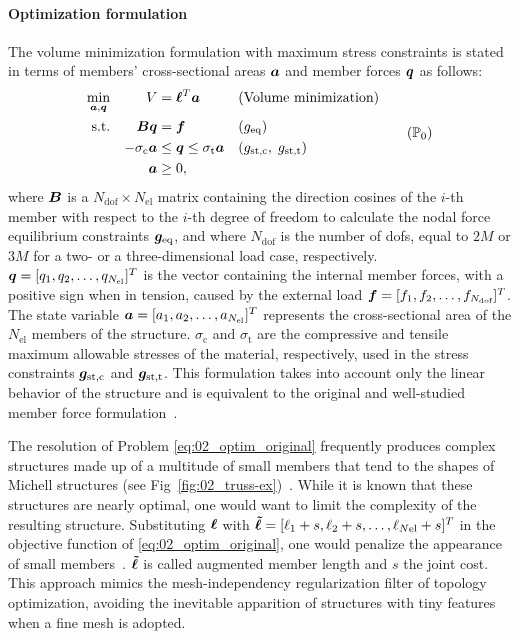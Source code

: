 \paragraph{Optimization formulation}
The volume minimization formulation with maximum stress constraints is stated in terms of members' cross-sectional areas $\bm{a}$ and member forces $\bm{q}$ as follows:
\begin{equation}
    \begin{aligned}
    \min_{\vect{a}, \vect{q}}   && V &= \vect{\ell}^{T}\vect{a} && \textrm{(Volume minimization)}\\
    \textrm{s.t.}   && \matr{B}\vect{q} &= \vect{f} && (g_\text{eq})\\
    && -\sigma_\text{c}\vect{a} &\leq \vect{q} \leq \sigma_\text{t}\vect{a} && (g_\text{st,c}, \; g_\text{st,t}) \\
    && \vect{a} &\geq 0, \\
    \end{aligned}
    \tag{$\mathbb{P}_0$}
    \label{eq:02_optim_original}
\end{equation}
where $\bm{B}$ is a $N_{\text{dof}} \times N_{\text{el}}$ matrix containing the direction cosines of the $i$-th member with respect to the $i$-th degree of freedom to calculate the nodal force equilibrium constraints $\bm{g}_\text{eq}$, and where $N_{\text{dof}}$ is the number of \gls{dofs}, equal to $2M$ or $3M$ for a two- or a three-dimensional load case, respectively. $\bm{q} = [q_1, q_2, \ldots,q_{N_{\text{el}}}]^T$ is the vector containing the internal member forces, with a positive sign when in tension, caused by the external load $\bm{f} = [f_1, f_2, \ldots,f_{N_{\text{dof}}}]^T$. The state variable $\bm{a} = [a_1, a_2, \ldots,a_{N_{\text{el}}}]^T$ represents the cross-sectional area of the $N_{\text{el}}$ members of the structure. $\sigma_\text{c}$ and $\sigma_\text{t}$ are the compressive and tensile maximum allowable stresses of the material, respectively, used in the stress constraints $\bm{g}_\text{st,c}$ and $\bm{g}_\text{st,t}$. This formulation takes into account only the linear behavior of the structure and is equivalent to the original and well-studied member force formulation~.

The resolution of Problem \ref{eq:02_optim_original} frequently produces complex structures made up of a multitude of small members that tend to the shapes of Michell structures (see Fig~\ref{fig:02_truss-ex})~. While it is known that these structures are nearly optimal, one would want to limit the complexity of the resulting structure. Substituting $\bm{\ell}$ with $\bm{\tilde{\ell}} = [\ell_1 + s, \ell_2 + s, \ldots,\ell_{N\text{el}} + s]^T$ in the objective function of \ref{eq:02_optim_original}, one would penalize the appearance of small members~. $\bm{\tilde{\ell}}$ is called augmented member length and $s$ the joint cost. This approach mimics the mesh-independency regularization filter of topology optimization, avoiding the inevitable apparition of structures with tiny features when a fine mesh is adopted.

